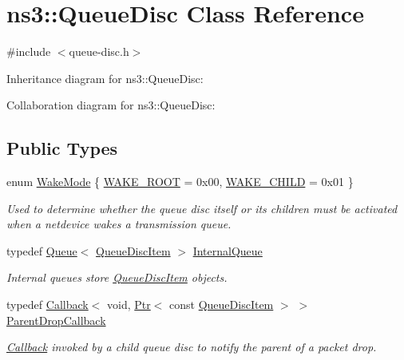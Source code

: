 \hypertarget{classns3_1_1QueueDisc}{}\section{ns3\+:\+:Queue\+Disc Class Reference}
\label{classns3_1_1QueueDisc}


{\ttfamily \#include $<$queue-\/disc.\+h$>$}



Inheritance diagram for ns3\+:\+:Queue\+Disc\+:


Collaboration diagram for ns3\+:\+:Queue\+Disc\+:
\subsection*{Public Types}
\begin{DoxyCompactItemize}
\item 
enum \hyperlink{classns3_1_1QueueDisc_a0b9b32e71d5becf66e6ac4b3d3de7c8b}{Wake\+Mode} \{ \hyperlink{classns3_1_1QueueDisc_a0b9b32e71d5becf66e6ac4b3d3de7c8ba56fb0e52526a39cefb47d24550bf47c6}{W\+A\+K\+E\+\_\+\+R\+O\+OT} = 0x00, 
\hyperlink{classns3_1_1QueueDisc_a0b9b32e71d5becf66e6ac4b3d3de7c8bad2dbf3b0b56e3e0d4d0f8f944c4d0fcd}{W\+A\+K\+E\+\_\+\+C\+H\+I\+LD} = 0x01
 \}\begin{DoxyCompactList}\small\item\em Used to determine whether the queue disc itself or its children must be activated when a netdevice wakes a transmission queue. \end{DoxyCompactList}
\item 
typedef \hyperlink{classns3_1_1Queue}{Queue}$<$ \hyperlink{classns3_1_1QueueDiscItem}{Queue\+Disc\+Item} $>$ \hyperlink{classns3_1_1QueueDisc_a3acb7d460465f9f13c6fbbdeae7508f8}{Internal\+Queue}
\begin{DoxyCompactList}\small\item\em Internal queues store \hyperlink{classns3_1_1QueueDiscItem}{Queue\+Disc\+Item} objects. \end{DoxyCompactList}\item 
typedef \hyperlink{classns3_1_1Callback}{Callback}$<$ void, \hyperlink{classns3_1_1Ptr}{Ptr}$<$ const \hyperlink{classns3_1_1QueueDiscItem}{Queue\+Disc\+Item} $>$ $>$ \hyperlink{classns3_1_1QueueDisc_abcb41646ec54f8206bc14df2c93762f4}{Parent\+Drop\+Callback}
\begin{DoxyCompactList}\small\item\em \hyperlink{classns3_1_1Callback}{Callback} invoked by a child queue disc to notify the parent of a packet drop. \end{DoxyCompactList}\end{DoxyCompactItemize}
